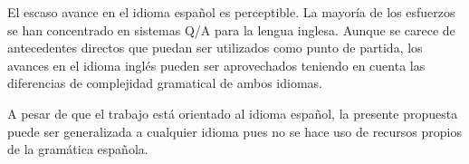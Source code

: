 El escaso avance en el idioma español es perceptible. La mayoría de los esfuerzos se han concentrado en sistemas Q/A para la lengua inglesa. Aunque se carece de antecedentes directos que puedan ser utilizados como punto de partida, los avances en el idioma inglés pueden ser aprovechados teniendo en cuenta las diferencias de complejidad gramatical de ambos idiomas.

A pesar de que el trabajo está orientado al idioma español, la presente propuesta puede ser generalizada a cualquier idioma pues no se hace uso de recursos propios de la gramática española.